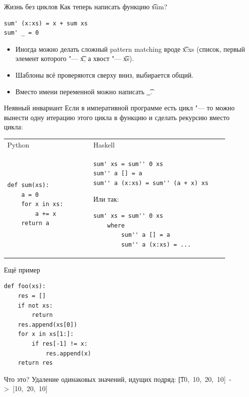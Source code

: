 \begin{frame}[t,fragile]{Жизнь без циклов}
	Как теперь написать функцию \t{sum}? \pause
\begin{verbatim}
sum' (x:xs) = x + sum xs
sum' _ = 0
\end{verbatim}
	\begin{itemize}
		\item Иногда можно делать сложный pattern matching вроде \t{x:xs} (список, первый элемент которого "--- \t{x}, а хвост "--- \t{xs}).
		\item Шаблоны всё проверяются сверху вниз, выбирается общий.
		\item Вместо имени переменной можно написать \t{\_}.
	\end{itemize}
\end{frame}

\begin{frame}[fragile]{Неявный инвариант}
	Если в императивной программе есть цикл "--- то можно вынести одну итерацию этого цикла в функцию и сделать рекурсию вместо цикла:

	\begin{tabular}{p{0.35\linewidth}p{0.55\linewidth}}
		\centering
		Python & Haskell \\
\begin{verbatim}
def sum(xs):
    a = 0
    for x in xs:
        a += x
    return a
\end{verbatim}
		&
\begin{verbatim}
sum' xs = sum'' 0 xs
sum'' a [] = a
sum'' a (x:xs) = sum'' (a + x) xs
\end{verbatim}
\pause
Или так:
\begin{verbatim}
sum' xs = sum'' 0 xs
    where
        sum'' a [] = a
        sum'' a (x:xs) = ...
\end{verbatim}
	\end{tabular}
\end{frame}

\begin{frame}[t, fragile]{Ещё пример}
\begin{verbatim}
def foo(xs):
    res = []
    if not xs:
        return
    res.append(xs[0])
    for x in xs[1:]:
        if res[-1] != x:
            res.append(x)
    return res
\end{verbatim}
	Что это?
	\pause
	Удаление одинаковых значений, идущих подряд: \t{[10,~10,~20,~10]~->~[10,~20,~10]}
\end{frame}

